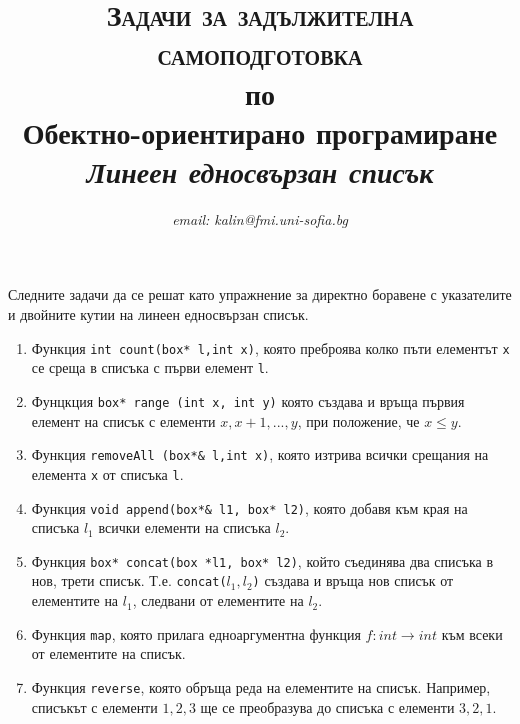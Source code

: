 \documentclass[12pt,a4paper]{article}
\author{\textit{email: kalin@fmi.uni-sofia.bg}}
\title{\textsc{Задачи за задължителна самоподготовка} \\
по \\
Обектно-ориентирано програмиране\\
\textit{Линеен едносвързан списък}}
\newcommand{\code}[1]{\texttt{#1}}
\begin{document}
\maketitle

Следните задачи да се решат като упражнение за директно боравене с указателите и двойните кутии на линеен едносвързан списък.

\begin{enumerate}

	\item  Функция \code{int count(box* l,int x)}, която преброява колко пъти елементът \code{x} се среща в списъка с първи елемент \code{l}.
	\item  Фунцкция \code{box* range (int x, int y)} която създава и връща първия елемент на списък с елементи $x, x+1, ..., y$, при положение, че $x \leq y$.
	\item  Функция \code{removeAll (box*\& l,int x)}, която изтрива всички срещания на елемента \code{x} от списъка \code{l}.
	\item  Функция \code{void append(box*\& l1, box* l2)}, която добавя към края на списъка $l_1$ всички елементи на списъка $l_2$.
	\item  Функция \code{box* concat(box *l1, box* l2)}, който съединява два списъка в нов, трети списък. Т.е. \code{concat($l_1,l_2$)} създава и връща нов списък от елементите на \code{$l_1$}, следвани от елементите на \code{$l_2$}.
	\item  Функция \code{map}, която прилага едноаргументна функция $f:int \rightarrow int$ към всеки от елементите на списък.
	\item  Функция \code{reverse}, която обръща реда на елементите на списък. Например, списъкът с елементи $1,2,3$ ще се преобразува до списъка с елементи $3,2,1$.
\end{enumerate}


	\vspace{20px}
\end{document}
